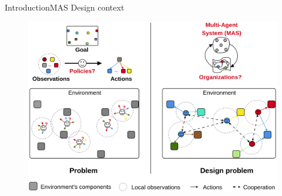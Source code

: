 \begin{frame}{Introduction}{MAS Design context}

    \begin{figure}
        \includegraphics[width=0.7\linewidth]{figures/problem_illustration.png}
    \end{figure}

\end{frame}



